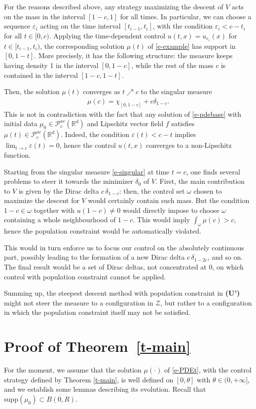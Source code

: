 \documentclass{article}
\newcommand{\R}{\mathbb{R}}
\newcommand{\Pac}{\mathcal{P}^{ac}_c(\R^{d})}
\theoremstyle{definition}\newtheorem{remark}{Remark}
\newcommand{\eps}{\varepsilon}
\newcommand{\bqn}{\begin{eqnarray}}
\newcommand{\eqnl}[1]{\label{#1}\end{eqnarray}}
\renewcommand{\r}[1]{\eqref{#1}}
\newcommand{\supp}{\mathrm{supp}}
\begin{document}
For the reasons described above, any strategy maximizing the descent of $V$ acts on the mass in the interval $[1-c,1]$ for all times. In particular, we can choose a sequence $\eps_i$ acting on the time interval $[t_{i-1},t_i]$, with the condition $\eps_i<c-t_i$ for all $t\in[0,c)$. Applying the time-dependent control $u(t,x)=u_{\eps_i}(x)$ for $t\in[t_{i-1},t_i)$, the corresponding solution $\mu(t)$ of \r{e-example} has support in $[0,1-t]$. More precisely, it has the following structure: the measure keeps having density 1 in the interval $[0,1-c]$, while the rest of the mass $c$ is contained in the interval $[1-c,1-t]$.

Then, the solution $\mu(t)$ converges as $t\nearrow c$ to the singular measure 
\bqn
\mu(c)=\chi_{[0,1-c]} +c\delta_{1-c}.
\eqnl{e-singular} 
This is  not in contradiction with the fact that any solution of \r{e-pdebase} with initial data $\mu_0\in\Pac$ and Lipschitz vector field $f$ satisfies $\mu(t)\in\Pac$. Indeed, the condition $\eps(t)<c-t$ implies $\lim_{t\to c} \eps(t)=0$, hence the control $u(t,x)$ converges to a non-Lipschitz function.

Starting from the singular measure \r{e-singular} at time $t=c$, one finds several problems to steer it towards the minimizer $\delta_0$ of $V$. First, the main contribution to $V$ is given by the Dirac delta $c\,\delta_{1-c}$: then, the control set $\omega$ chosen to maximize the descent for $V$ would certainly contain such mass. But the condition $1-c\in \omega$ together with $u(1-c)\neq 0$ would directly impose to choose $\omega$ containing a whole neighbourhood of $1-c$. This would imply $\int_\omega \mu(c)>c$, hence the population constraint would be automatically violated.

This would in turn enforce us to focus our control on the absolutely continuous part, possibly leading to the formation of a new Dirac delta $c\,\delta_{1-2c}$, and so on. The final result would be a set of Dirac deltas, not concentrated at $0$, on which control with population constraint cannot be applied.

Summing up, the steepest descent method with population constraint in {\bf (U')} might not steer the measure to a configuration in $\mathcal{Z}$, but rather to a configuration in which the population constraint itself may not be satisfied.



\section{Proof of Theorem~\ref{t-main}}
\label{s-proof}
For the moment, we assume that the solution $\mu(\cdot)$ of \eqref{e-PDEt}, with the control strategy defined by Theorem \ref{t-main}, is well defined on $[0,\theta]$ with $\theta\in(0,+\infty]$, and we establish some lemmas describing its evolution. Recall that $\supp(\mu_0)\subset \overline{B(0,R)}$.
\end{document}
